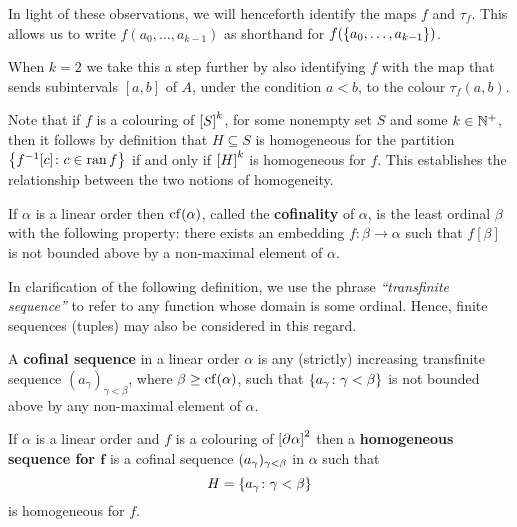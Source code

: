 \begin{conv}[Colourings]\label{rem:Col}
	In light of these observations, we will henceforth identify the maps $f$ and
	$\tau_f$.  This allows us to write $f(a_0,\dotsc,a_{k-1})$ as
	shorthand for $f(\set{a_0,\dotsc,a_{k-1}})$.

	When $k=2$ we take this a step further by also identifying $f$ with the map
	that sends subintervals $[a,b]$ of $A$, under the condition $a<b$, to the
	colour $\tau_f(a,b)$.
\end{conv}

\begin{rem}[Homogeneity]\label{rem:hom}
	Note that if $f$ is a colouring of $\subsets{k}{S}$, for some nonempty set
	$S$ and some $k\in\posnats$, then it follows by definition that $H\subseteq
	S$ is homogeneous for the partition $\setbuild{f^{-1}[c]}{c\in\range f}$ if
	and only if $\subsets{k}{H}$ is homogeneous for $f$.  This establishes the
	relationship between the two notions of homogeneity.
\end{rem}


\begin{dfn}[Cofinality]
	If $\alpha$ is a linear order then $\cf(\alpha)$, called the
	\textbf{cofinality} of $\alpha$, is the least ordinal $\beta$ with the
	following property: there exists an embedding $f\colon\beta\to\alpha$ such
	that $f[\beta]$ is not bounded above by a non-maximal element of $\alpha$.
\end{dfn}

In clarification of the following definition, we use the phrase
\textit{``transfinite sequence''} to refer to any function whose domain is some
ordinal.  Hence, finite sequences (tuples) may also be considered in this
regard.

\begin{dfn}
	A \textbf{cofinal sequence} in a linear order $\alpha$ is any (strictly)
	increasing transfinite sequence $(a_\gamma)_{\gamma<\beta}$, where
	$\beta\geq\cf(\alpha)$, such that $\setbuild{a_\gamma}{\gamma<\beta}$ is
	not bounded above by any non-maximal element of $\alpha$.
\end{dfn}

\begin{dfn}
	If $\alpha$ is a linear order and $f$ is a colouring of
	$\subsets{2}{\domain\alpha}$ then a \textbf{homogeneous sequence for
	$\bm{f}$} is a cofinal sequence $\family{a_\gamma}{\gamma<\beta}$ in
	$\alpha$ such that
	\begin{equation}
		H=\setbuild{a_\gamma}{\gamma<\beta}
	\end{equation}
	is homogeneous for $f$.
\end{dfn}

